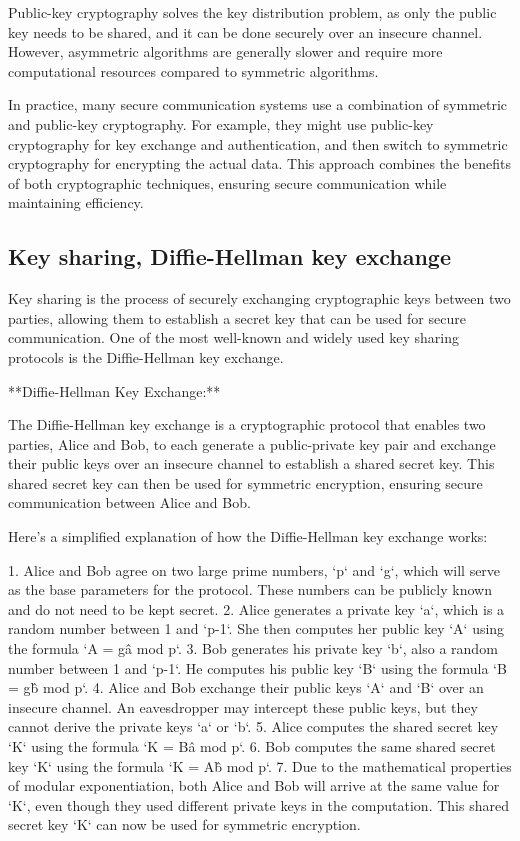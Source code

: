 \documentclass{article}
\begin{document}
Public-key cryptography solves the key distribution problem, as only the public key needs to be shared, and it can be done securely over an insecure channel. However, asymmetric algorithms are generally slower and require more computational resources compared to symmetric algorithms.

In practice, many secure communication systems use a combination of symmetric and public-key cryptography. For example, they might use public-key cryptography for key exchange and authentication, and then switch to symmetric cryptography for encrypting the actual data. This approach combines the benefits of both cryptographic techniques, ensuring secure communication while maintaining efficiency.


\subsection{Key sharing, Diffie-Hellman key exchange}

Key sharing is the process of securely exchanging cryptographic keys between two parties, allowing them to establish a secret key that can be used for secure communication. One of the most well-known and widely used key sharing protocols is the Diffie-Hellman key exchange.

**Diffie-Hellman Key Exchange:**

The Diffie-Hellman key exchange is a cryptographic protocol that enables two parties, Alice and Bob, to each generate a public-private key pair and exchange their public keys over an insecure channel to establish a shared secret key. This shared secret key can then be used for symmetric encryption, ensuring secure communication between Alice and Bob.

Here's a simplified explanation of how the Diffie-Hellman key exchange works:

1. Alice and Bob agree on two large prime numbers, `p` and `g`, which will serve as the base parameters for the protocol. These numbers can be publicly known and do not need to be kept secret.
2. Alice generates a private key `a`, which is a random number between 1 and `p-1`. She then computes her public key `A` using the formula `A = g\^a mod p`.
3. Bob generates his private key `b`, also a random number between 1 and `p-1`. He computes his public key `B` using the formula `B = g\^b mod p`.
4. Alice and Bob exchange their public keys `A` and `B` over an insecure channel. An eavesdropper may intercept these public keys, but they cannot derive the private keys `a` or `b`.
5. Alice computes the shared secret key `K` using the formula `K = B\^a mod p`.
6. Bob computes the same shared secret key `K` using the formula `K = A\^b mod p`.
7. Due to the mathematical properties of modular exponentiation, both Alice and Bob will arrive at the same value for `K`, even though they used different private keys in the computation. This shared secret key `K` can now be used for symmetric encryption.
\end{document}

